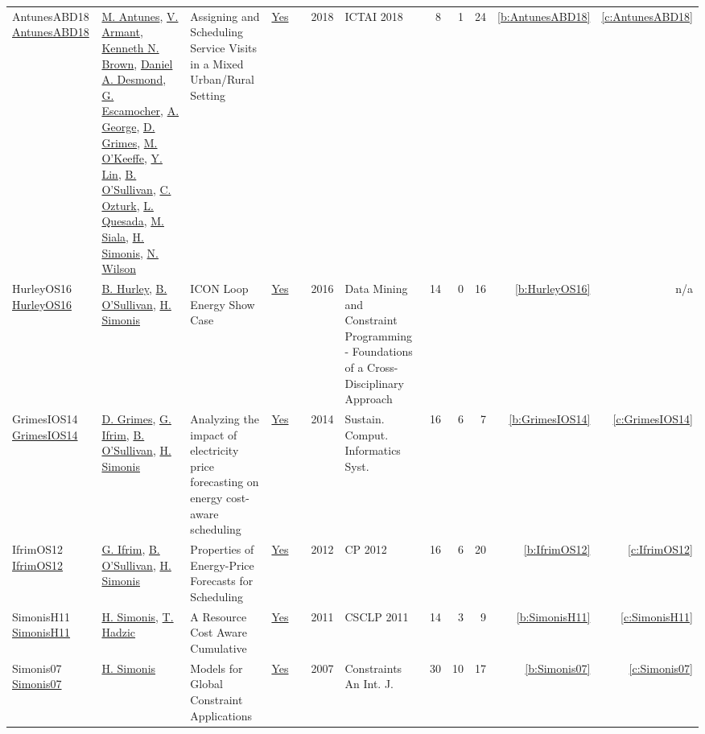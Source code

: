 {\begin{longtable}{>{\raggedright\arraybackslash}p{3cm}>{\raggedright\arraybackslash}p{6cm}>{\raggedright\arraybackslash}p{6.5cm}rrrp{2.5cm}rrrrr}
AntunesABD18 \href{https://doi.org/10.1109/ICTAI.2018.00027}{AntunesABD18} & \hyperref[auth:a891]{M. Antunes}, \hyperref[auth:a892]{V. Armant}, \hyperref[auth:a223]{Kenneth N. Brown}, \hyperref[auth:a893]{Daniel A. Desmond}, \hyperref[auth:a894]{G. Escamocher}, \hyperref[auth:a895]{A. George}, \hyperref[auth:a183]{D. Grimes}, \hyperref[auth:a896]{M. O'Keeffe}, \hyperref[auth:a897]{Y. Lin}, \hyperref[auth:a16]{B. O'Sullivan}, \hyperref[auth:a898]{C. Ozturk}, \hyperref[auth:a899]{L. Quesada}, \hyperref[auth:a130]{M. Siala}, \hyperref[auth:a17]{H. Simonis}, \hyperref[auth:a838]{N. Wilson} & Assigning and Scheduling Service Visits in a Mixed Urban/Rural Setting & \href{works/AntunesABD18.pdf}{Yes} & \cite{AntunesABD18} & 2018 & ICTAI 2018 & 8 & 1 & 24 & \ref{b:AntunesABD18} & \ref{c:AntunesABD18}\\
HurleyOS16 \href{https://doi.org/10.1007/978-3-319-50137-6\_15}{HurleyOS16} & \hyperref[auth:a900]{B. Hurley}, \hyperref[auth:a16]{B. O'Sullivan}, \hyperref[auth:a17]{H. Simonis} & {ICON} Loop Energy Show Case & \href{works/HurleyOS16.pdf}{Yes} & \cite{HurleyOS16} & 2016 & Data Mining and Constraint Programming - Foundations of a Cross-Disciplinary Approach & 14 & 0 & 16 & \ref{b:HurleyOS16} & n/a\\
GrimesIOS14 \href{https://doi.org/10.1016/j.suscom.2014.08.009}{GrimesIOS14} & \hyperref[auth:a183]{D. Grimes}, \hyperref[auth:a184]{G. Ifrim}, \hyperref[auth:a16]{B. O'Sullivan}, \hyperref[auth:a17]{H. Simonis} & Analyzing the impact of electricity price forecasting on energy cost-aware scheduling & \href{works/GrimesIOS14.pdf}{Yes} & \cite{GrimesIOS14} & 2014 & Sustain. Comput. Informatics Syst. & 16 & 6 & 7 & \ref{b:GrimesIOS14} & \ref{c:GrimesIOS14}\\
IfrimOS12 \href{https://doi.org/10.1007/978-3-642-33558-7\_68}{IfrimOS12} & \hyperref[auth:a184]{G. Ifrim}, \hyperref[auth:a16]{B. O'Sullivan}, \hyperref[auth:a17]{H. Simonis} & Properties of Energy-Price Forecasts for Scheduling & \href{works/IfrimOS12.pdf}{Yes} & \cite{IfrimOS12} & 2012 & CP 2012 & 16 & 6 & 20 & \ref{b:IfrimOS12} & \ref{c:IfrimOS12}\\
SimonisH11 \href{http://dx.doi.org/10.1007/978-3-642-19486-3_5}{SimonisH11} & \hyperref[auth:a17]{H. Simonis}, \hyperref[auth:a924]{T. Hadzic} & A Resource Cost Aware Cumulative & \href{works/SimonisH11.pdf}{Yes} & \cite{SimonisH11} & 2011 & CSCLP 2011 & 14 & 3 & 9 & \ref{b:SimonisH11} & \ref{c:SimonisH11}\\
Simonis07 \href{https://doi.org/10.1007/s10601-006-9011-7}{Simonis07} & \hyperref[auth:a17]{H. Simonis} & Models for Global Constraint Applications & \href{works/Simonis07.pdf}{Yes} & \cite{Simonis07} & 2007 & Constraints An Int. J. & 30 & 10 & 17 & \ref{b:Simonis07} & \ref{c:Simonis07}\\

\end{longtable}}
